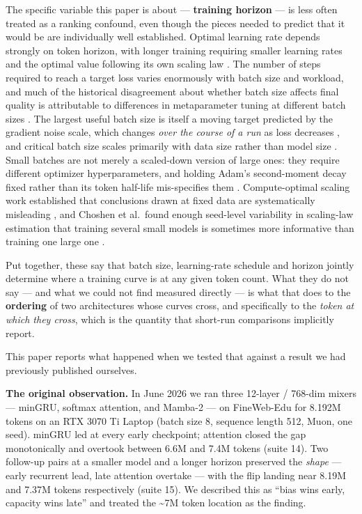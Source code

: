 The specific variable this paper is about --- \textbf{training horizon} --- is less often treated as a
ranking confound, even though the pieces needed to predict that it would be are individually well
established. Optimal learning rate depends strongly on token horizon, with longer training
requiring smaller learning rates and the optimal value following its own scaling law \cite{ref31}. The
number of steps required to reach a target loss varies enormously with batch size and workload,
and much of the historical disagreement about whether batch size affects final quality is
attributable to differences in metaparameter tuning at different batch sizes \cite{ref27}. The largest
useful batch size is itself a moving target predicted by the gradient noise scale, which changes
\emph{over the course of a run} as loss decreases \cite{ref28}, and critical batch size scales primarily with
data size rather than model size \cite{ref29}. Small batches are not merely a scaled-down version of large
ones: they require different optimizer hyperparameters, and holding Adam's second-moment decay
fixed rather than its token half-life mis-specifies them \cite{ref30}. Compute-optimal scaling work
established that conclusions drawn at fixed data are systematically misleading \cite{ref9,ref10}, and
Choshen et al.~found enough seed-level variability in scaling-law estimation that training several
small models is sometimes more informative than training one large one \cite{ref37}.

Put together, these say that batch size, learning-rate schedule and horizon jointly determine
where a training curve is at any given token count. What they do not say --- and what we could not
find measured directly --- is what that does to the \textbf{ordering} of two architectures whose curves
cross, and specifically to the \emph{token at which they cross}, which is the quantity that short-run
comparisons implicitly report.

This paper reports what happened when we tested that against a result we had previously published
ourselves.

\textbf{The original observation.} In June 2026 we ran three 12-layer / 768-dim mixers --- minGRU,
softmax attention, and Mamba-2 \cite{ref1,ref2} --- on FineWeb-Edu \cite{ref25} for 8.192M tokens on an RTX 3070 Ti
Laptop (batch size 8, sequence length 512, Muon, one seed). minGRU led at every early checkpoint;
attention closed the gap monotonically and overtook between 6.6M and 7.4M tokens (suite 14). Two
follow-up pairs at a smaller model and a longer horizon preserved the \emph{shape} --- early recurrent
lead, late attention overtake --- with the flip landing near 8.19M and 7.37M tokens respectively
(suite 15). We described this as ``bias wins early, capacity wins late'' and treated the \textasciitilde7M token
location as the finding.

